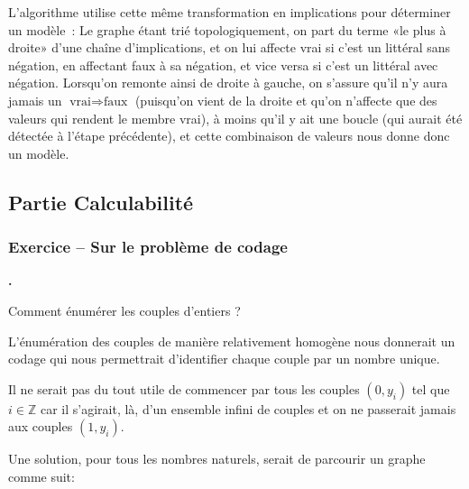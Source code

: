 \documentclass{article}
\newcounter{exocount}
\newcounter{enoncecount}
\newenvironment{enonce}
{
\stepcounter{enoncecount}
\bf\small \arabic{enoncecount}.
\begin{bf}
}
{
\end{bf}
}
\begin{document}

L'algorithme utilise cette même transformation en implications pour déterminer un modèle~: Le graphe étant trié topologiquement, on part du
terme «le plus à droite» d'une chaîne d'implications, et on lui affecte vrai si c'est un littéral sans négation, en affectant faux à sa
négation, et vice versa si c'est un littéral avec négation. Lorsqu'on remonte ainsi de droite à gauche, on s'assure qu'il n'y aura jamais un
$\text{vrai} \Rightarrow \text{faux}$ (puisqu'on vient de la droite et qu'on n'affecte que des valeurs qui rendent le membre vrai), à moins
qu'il y ait une boucle (qui aurait été détectée à l'étape précédente), et cette combinaison de valeurs nous donne donc un modèle.

\subsection{Partie Calculabilité}

\subsubsection*{Exercice \bf\small {} -- Sur le problème de codage}
\setcounter{enoncecount}{0}

\begin{enonce}
Comment énumérer les couples d'entiers ?
\end{enonce}


L'énumération des couples de manière relativement homogène nous donnerait un codage qui nous permettrait d'identifier chaque couple par un nombre unique. 

Il ne serait pas du tout utile de commencer par tous les couples $(0,y_{i})$  tel que $i \in \mathbb{Z}$ car il s'agirait, là, d'un ensemble infini de couples et on ne passerait jamais aux couples $(1, y_{i})$. 

Une solution, pour tous les nombres naturels, serait de parcourir un graphe comme suit:
\end{document}
